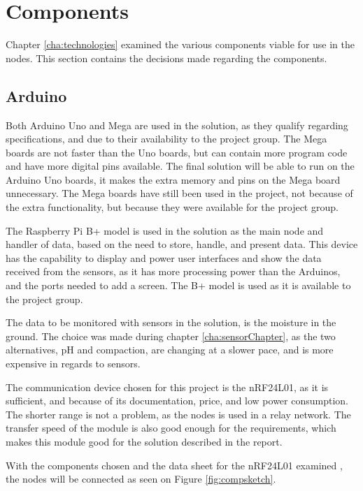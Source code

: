 \section{Components}
Chapter \ref{cha:technologies} examined the various components viable for use in the nodes. This section contains the decisions made regarding the components.

\subsection{Arduino}
Both Arduino Uno and Mega are used in the solution, as they qualify regarding specifications, and due to their availability to the project group. The Mega boards are not faster than the Uno boards, but can contain more program code and have more digital pins available. The final solution will be able to run on the Arduino Uno boards, it makes the extra memory and pins on the Mega board unnecessary. The Mega boards have still been used in the project, not because of the extra functionality, but because they were available for the project group.

The Raspberry Pi B+ model is used in the solution as the main node and handler of data, based on the need to store, handle, and present data.  This device has the capability to display and power user interfaces and show the data received from the sensors, as it has more processing power than the Arduinos, and the ports needed to add a screen. The B+ model is used as it is available to the project group.

The data to be monitored with sensors in the solution, is the moisture in the ground. The choice was made during chapter \ref{cha:sensorChapter}, as the two alternatives, pH and compaction, are changing at a slower pace, and is more expensive in regards to sensors.

The communication device chosen for this project is the nRF24L01, as it is sufficient, and because of its documentation, price, and low power consumption. The shorter range is not a problem, as the nodes is used in a relay network. The transfer speed of the module is also good enough for the requirements, which makes this module good for the solution described in the report.

With the components chosen and the data sheet for the nRF24L01 examined \cite{nf24datasheet}, the nodes will be connected as seen on Figure \ref{fig:compsketch}.

